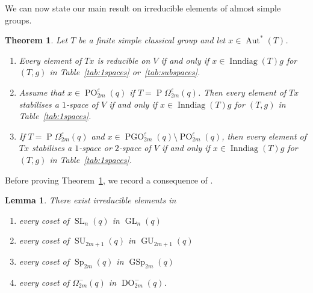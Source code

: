\documentclass[11pt]{article}
\numberwithin{equation}{section}
\theoremstyle{shdefinition}
\theoremstyle{shplain}
\newtheorem{theorem}[definition]{Theorem}
\newtheorem{lemma}[definition]{Lemma}
\newcommand{\e}{\varepsilon}
\newcommand{\<}{\langle}
\renewcommand{\>}{\rangle}
\newcommand{\Aut}{\operatorname{Aut}}
\newcommand{\Inndiag}{\operatorname{Inndiag}}
\renewcommand{\:}{\colon}
\newcommand{\SL}{\operatorname{SL}}
\newcommand{\GL}{\operatorname{GL}}
\newcommand{\Sp}{\operatorname{Sp}}
\newcommand{\GSp}{\operatorname{GSp}}
\newcommand{\SU}{\operatorname{SU}}
\newcommand{\GU}{\operatorname{GU}}
\newcommand{\Om}{\Omega}
\newcommand{\DO}{\operatorname{DO}}
\newcommand{\POm}{\operatorname{P}\!\Om}
\newcommand{\PO}{\operatorname{PO}}
\newcommand{\PGO}{\operatorname{PGO}}
\begin{document}
We can now state our main result on irreducible elements of almost simple groups.

\begin{theorem} \label{thm:subspaces}
Let $T$ be a finite simple classical group and let $x \in \Aut^*(T)$. 
\begin{enumerate}
\item Every element of $Tx$ is reducible on $V$ if and only if $x \in \Inndiag(T)g$ for $(T,g)$ in Table~\ref{tab:1spaces} or~\ref{tab:subspaces}.
\item Assume that $x \in \PO^\e_{2m}(q)$ if $T = \POm^\e_{2m}(q)$. Then every element of $Tx$ stabilises a $1$-space of $V$ if and only if $x \in \Inndiag(T)g$ for $(T,g)$ in Table~\ref{tab:1spaces}. 
\item If $T = \POm^\e_{2m}(q)$ and $x \in \PGO^\e_{2m}(q) \setminus \PO^\e_{2m}(q)$, then every element of $Tx$ stabilises a $1$-space or $2$-space of $V$ if and only if $x \in \Inndiag(T)g$ for $(T,g)$ in Table~\ref{tab:1spaces}.
\end{enumerate}
\end{theorem}

Before proving Theorem~\ref{thm:subspaces}, we record a consequence of \cite[Lemmas~5.3.2--5.3.4 \& 6.3.2]{ref:Harper}.

\begin{lemma} \label{lem:subspaces}
There exist irreducible elements in 
\begin{enumerate}
\item every coset of $\SL_n(q)$ in $\GL_n(q)$
\item every coset of $\SU_{2m+1}(q)$ in $\GU_{2m+1}(q)$
\item every coset of $\Sp_{2m}(q)$ in $\GSp_{2m}(q)$
\item every coset of $\Omega^-_{2m}(q)$ in $\DO^-_{2m}(q)$.
\end{enumerate}
\end{lemma}
\end{document}

